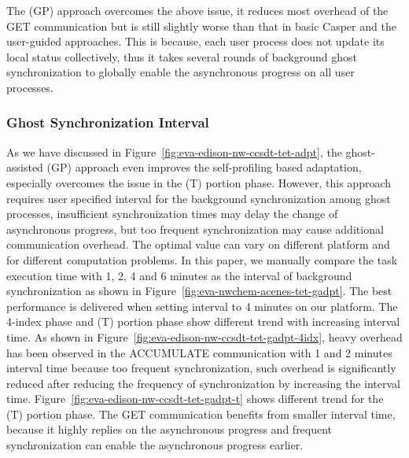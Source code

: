 The \libname(GP) approach overcomes the above issue, it reduces
most overhead of the GET communication but is still slightly worse than
that in basic Casper and the user-guided approaches. This
is because, each user process does not update its local status
collectively, thus it takes several rounds of background ghost
synchronization to globally enable the asynchronous progress on
all user processes.

\subsubsection{Ghost Synchronization Interval}
As we have discussed in Figure~\ref{fig:eva-edison-nw-ccsdt-tet-adpt},
the ghost-assisted \libname(GP) approach even improves the self-profiling
based adaptation, especially overcomes the issue in the (T) portion phase.
However, this approach requires user specified interval for the background
synchronization among ghost processes, insufficient synchronization times
may delay the change of asynchronous progress, but too frequent synchronization
may cause additional communication overhead. The optimal value can vary
on different platform and for different computation problems. In this paper,
we manually compare the task execution time with 1, 2, 4 and 6 minutes
as the interval of background synchronization as shown in
Figure~\ref{fig:eva-nwchem-acenes-tet-gadpt}. The best performance is
delivered when setting interval to 4 minutes on our platform. The
4-index phase and (T) portion phase show different trend with increasing
interval time. As shown in Figure~\ref{fig:eva-edison-nw-ccsdt-tet-gadpt-4idx},
heavy overhead has been observed in the ACCUMULATE communication with
1 and 2 minutes interval time because too frequent synchronization,
such overhead is significantly reduced after reducing the frequency
of synchronization by increasing the interval time.
Figure~\ref{fig:eva-edison-nw-ccsdt-tet-gadpt-t} shows different trend
for the (T) portion phase. The GET communication benefits from smaller
interval time, because it highly replies on the asynchronous progress
and frequent synchronization can enable the asynchronous progress earlier.


